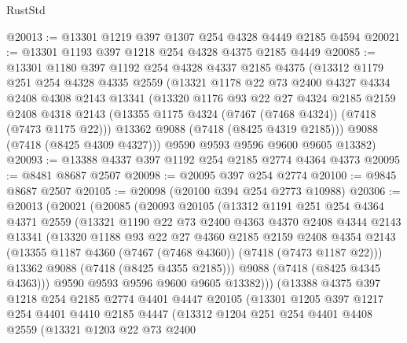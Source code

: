\begin{lexlean}{RustStd}
\begin{coremodule}
@20013 := @13301 @1219 @397 @1307 @254 @4328 @4449 @2185 @4594
@20021 := @13301 @1193 @397 @1218 @254 @4328 @4375 @2185 @4449
@20085 := @13301
    @1180
    @397
    @1192
    @254
    @4328
    @4337
    @2185
    @4375
    (@13312
      @1179
      @251
      @254
      @4328
      @4335
      @2559
      (@13321
        @1178
        @22
        @73
        @2400
        @4327
        @4334
        @2408
        @4308
        @2143
        @13341
        (@13320
          @1176
          @93
          @22
          @27
          @4324
          @2185
          @2159
          @2408
          @4318
          @2143
          (@13355 @1175 @4324 (@7467 (@7468 @4324)) (@7418 (@7473 @1175 @22)))
          @13362
          @9088
          (@7418 (@8425 @4319 @2185)))
        @9088
        (@7418 (@8425 @4309 @4327)))
      @9590
      @9593
      @9596
      @9600
      @9605
      @13382)
@20093 := @13388 @4337 @397 @1192 @254 @2185 @2774 @4364 @4373
@20095 := @8481 @8687 @2507
@20098 := @20095 @397 @254 @2774
@20100 := @9845 @8687 @2507
@20105 := @20098 (@20100 @394 @254 @2773 @10988)
@20306 := @20013
    (@20021
      (@20085
        (@20093
          @20105
          (@13312
            @1191
            @251
            @254
            @4364
            @4371
            @2559
            (@13321
              @1190
              @22
              @73
              @2400
              @4363
              @4370
              @2408
              @4344
              @2143
              @13341
              (@13320
                @1188
                @93
                @22
                @27
                @4360
                @2185
                @2159
                @2408
                @4354
                @2143
                (@13355 @1187 @4360 (@7467 (@7468 @4360)) (@7418 (@7473 @1187 @22)))
                @13362
                @9088
                (@7418 (@8425 @4355 @2185)))
              @9088
              (@7418 (@8425 @4345 @4363)))
            @9590
            @9593
            @9596
            @9600
            @9605
            @13382)))
      (@13388
        @4375
        @397
        @1218
        @254
        @2185
        @2774
        @4401
        @4447
        @20105
        (@13301
          @1205
          @397
          @1217
          @254
          @4401
          @4410
          @2185
          @4447
          (@13312
            @1204
            @251
            @254
            @4401
            @4408
            @2559
            (@13321
              @1203
              @22
              @73
              @2400

\end{coremodule}
\end{lexlean}
